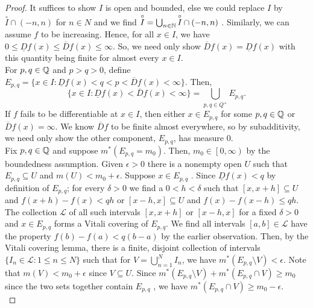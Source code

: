 \begin{proof}
	It suffices to show \(I\) is open and bounded, else we could replace \(I\) by \(\overset{\circ}{I} \cap \left( -n, n \right) \) for \(n \in N\) and we find \(\overset{\circ}{I} = \bigcup_{n \in \mathbb{N}} \overset{\circ}{I}\cap \left( -n, n \right) \) . Similarly, we can assume \(f\) to be increasing. Hence, for all \(x \in I\), we have \(0 \le \underline{D} f\left( x \right)  \le \overline{D}f\left( x \right) \le \infty\). So, we need only show \(\overline{D}f\left( x \right)  = \underline{D} f\left( x \right) \) with this quantity being finite for almost every \(x \in I\).\\
	For \(p, q \in \mathbb{Q}\) and \(p > q > 0\), define \(E_{p, q} = \{x \in I : \underline{D} f\left( x \right) < q < p < \overline{D}f\left( x \right) < \infty\} \). Then, \[
		\{x \in I : \underline{D} f\left( x \right) < \overline{D}f\left( x \right) < \infty\} = \bigcup_{p, q \in Q^{+}} E_{p, q}
	.\]
	If \(f\) fails to be differentiable at \(x \in I\), then either \(x \in E_{p, q}\) for some \(p, q \in \mathbb{Q}\) or \(\overline{D}f\left( x \right) = \infty\). We know \(\overline{D}f\) to be finite almost everywhere, so by subadditivity, we need only show the other component, \(E_{p, q}\), has measure \(0\).\\
	Fix \(p, q \in \mathbb{Q}\) and suppose \(m^{*}\left( E_{p, q} = m_0 \right) \). Then, \(m_0 \in \left[ 0, \infty \right) \) by the boundedness assumption. Given \(\epsilon > 0\) there is a nonempty open \(U\) such that \(E_{p, q} \subseteq U\) and \(m\left( U \right) < m_0 + \epsilon\). Suppose \(x \in E_{p, q}\) . Since \( \underline{D}f\left( x \right) < q\) by definition of \(E_{p, q}\); for every \(\delta > 0\) we find a \(0 < h < \delta\) such that \(\left[ x, x+ h \right] \subseteq U\) and \(f\left( x + h \right) - f\left( x \right)  < qh\) or \(\left[ x - h, x \right] \subseteq U\) and \(f\left( x \right) - f\left( x-h \right) \le qh\).\\
	The collection \(\mathscr{L}\) of all such intervals \(\left[ x, x + h \right] \) or \(\left[ x - h, x \right] \)  for a fixed \(\delta > 0\) and \(x \in E_{p, q}\) forms a Vitali covering of \(E_{p, q}\). We find all intervals \(\left[ a, b \right] \in \mathscr{L}\) have the property \(f\left( b \right)  - f\left( a \right) < q \left( b-a \right) \) by the earlier observation. Then, by the Vitali covering lemma, there is a finite, disjoint collection of intervals \(\{I_{n} \in \mathscr{L} : 1 \le n \le N\} \) such that for \(V = \bigcup_{ n=1} ^{N}I_{n}\), we have \(m^{*}\left( E_{p, q}\setminus V \right)< \epsilon \). Note that \(m\left( V \right) < m_0 + \epsilon\) since \(V \subseteq U\). Since \(m^{*}\left( E_{p, q}\setminus V \right) + m^{*}\left( E_{p, q}\cap V \right) \ge m_0 \) since the two sets together contain \(E_{p, q}\) , we have \(m^{*}\left( E_{p, q}\cap V \right)\ge m_0 - \epsilon \).\\

\end{proof}
